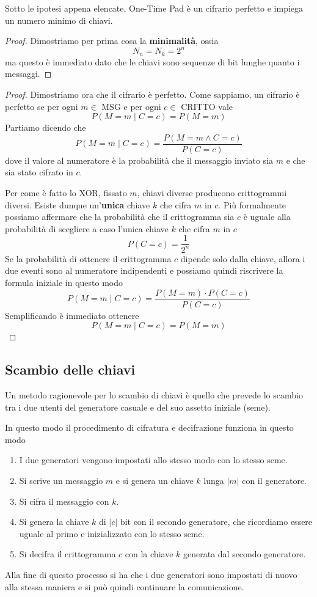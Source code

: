 \begin{theorem}
	Sotto le ipotesi appena elencate, One-Time Pad \`e un cifrario perfetto e impiega un numero minimo di chiavi.
	\begin{proof}
		Dimostriamo per prima cosa la \textbf{minimalit\`a}, ossia
		\[ N_n = N_k = 2^n \]
		ma questo \`e immediato dato che le chiavi sono sequenze di bit lunghe quanto i messaggi.
	\end{proof}

	\begin{proof}
		Dimostriamo ora che il cifrario \`e perfetto. Come sappiamo, un cifrario \`e perfetto se per ogni $m \in$ MSG e
		per ogni $c \in$ CRITTO vale
		\[ P(M = m \mid C = c) = P(M = m) \]
		Partiamo dicendo che
		\[ P(M = m \mid C = c) = \frac{P(M = m \wedge C = c)}{P(C = c)} \]
		dove il valore al numeratore \`e la probabilit\`a che il messaggio inviato sia $m$ e che sia stato cifrato in $c$.

		Per come \`e fatto lo XOR, fissato $m$, chiavi diverse producono crittogrammi diversi. Esiste dunque
		un'\textbf{unica} chiave $k$ che cifra $m$ in $c$. Pi\`u formalmente possiamo affermare che la probabilit\`a che
		il crittogramma sia $c$ \`e uguale alla probabilit\`a di scegliere a caso l'unica chiave $k$ che cifra $m$ in $c$
		\[ P(C = c) = \frac{1}{2^n} \]
		Se la probabilit\`a di ottenere il crittogramma $c$ dipende solo dalla chiave, allora i due eventi sono al
		numeratore indipendenti e possiamo quindi riscrivere la formula iniziale in questo modo
		\[ P(M = m \mid C = c) = \frac{P(M = m) \cdot P(C = c)}{P(C = c)} \]
		Semplificando \`e immediato ottenere
		\[ P(M = m \mid C = c) = P(M = m) \]
	\end{proof}
\end{theorem}

\subsection{Scambio delle chiavi}\label{chiavi_otp}
Un metodo ragionevole per lo scambio di chiavi \`e quello che prevede lo scambio tra i due utenti del generatore casuale
e del suo assetto iniziale (seme).

In questo modo il procedimento di cifratura e decifrazione funziona in questo modo
\begin{enumerate}
	\item I due generatori vengono impostati allo stesso modo con lo stesso seme.
	\item Si scrive un messaggio $m$ e si genera un chiave $k$ lunga $|m|$ con il generatore.
	\item Si cifra il messaggio con $k$.
	\item Si genera la chiave $k$ di $|c|$ bit con il secondo generatore, che ricordiamo essere uguale al primo e
	      inizializzato con lo stesso seme.
	\item Si decifra il crittogramma $c$ con la chiave $k$ generata dal secondo generatore.
\end{enumerate}
Alla fine di questo processo si ha che i due generatori sono impostati di nuovo alla stessa maniera e si pu\`o quindi
continuare la comunicazione.

